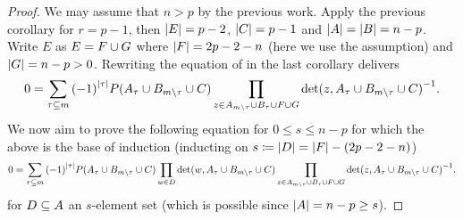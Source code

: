 \begin{proof}
    We may assume that $n>p$ by the previous work.
    Apply the previous corollary for $r=p-1$, then $\left\vert{E}\right\vert=p-2$, $\left\vert{C}\right\vert=p-1$ and $\left\vert{A}\right\vert=\left\vert{B}\right\vert=n-p$.
    Write $E$ as $E=F\cup G$ where $\left\vert{F}\right\vert = 2p-2-n$ (here we use the assumption) and $\left\vert{G}\right\vert = n-p>0$.
    Rewriting the equation of in the last corollary delivers
    $$
  0 = \sum_{\tau\subseteq m}{{(-1)}^{\left\vert{\tau}\right\vert}P(A_{\tau}\cup B_{m\setminus\tau}\cup C)}\prod_{\substack{z\in A_{m\setminus\tau}\cup B_{\tau}\cup F\cup G}}{{\det(z,A_{\tau}\cup B_{m\setminus\tau}\cup C)}^{-1}}.
    $$
    We now aim to prove the following equation for $0\leq s\leq n-p$ for which the above is the base of induction (inducting on $s\mathrel{\mathrel{\mathop:}\mkern-1.2mu=} \left\vert{D}\right\vert = \left\vert{F}\right\vert-(2p-2-n)$)
    $$
  0 = \sum_{\tau\subseteq m}{{(-1)}^{\left\vert{\tau}\right\vert}P(A_{\tau}\cup B_{m\setminus\tau}\cup C)}\prod_{w\in D}{\det(w,A_{\tau}\cup B_{m\setminus\tau}\cup C)}\prod_{\substack{z\in A_{m\setminus\tau}\cup B_{\tau}\cup F\cup G}}{{\det(z,A_{\tau}\cup B_{m\setminus\tau}\cup C)}^{-1}}.
    $$
    for $D\subseteq A$ an $s$-element set (which is possible since $\left\vert{A}\right\vert=n-p\geq s$).
    

\end{proof}
